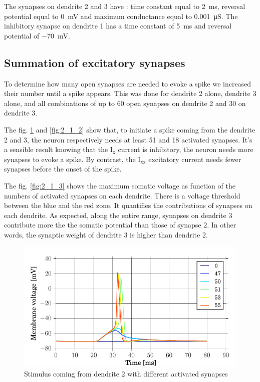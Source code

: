 \documentclass[a4paper, 10pt, conference]{ieeeconf}      %
\begin{document}
The synapses on dendrite 2 and 3 have : time constant equal to \SI{2}{\milli\second}, reversal potential equal to \SI{0}{\milli\volt} and maximum conductance equal to \SI{0.001}{\micro\siemens}. The inhibitory synapse on dendrite 1 has a time constant of \SI{5}{\milli\second} and reversal potential of \SI{-70}{\milli\volt}. 


\subsection{Summation of excitatory synapses}

To determine how many open synapses are needed to evoke a spike we increased their number until a spike appears. This was done for dendrite 2 alone, dendrite 3 alone, and all combinations of up to 60 open synapses on dendrite 2 and 30 on dendrite 3. 

The fig. \ref{fig:2_1_1} and \ref{fig:2_1_2} show that, to initiate a spike coming from the dendrite 2 and 3, the neuron respectively needs at least 51 and 18 activated synapses. It’s a sensible result knowing that the I$_\text{x}$ current is inhibitory, the neuron needs more synapses to evoke a spike. By contrast, the I$_\text{xx}$ excitatory current needs fewer synapses before the onset of the spike. 

The fig. \ref{fig:2_1_3} shows the maximum somatic voltage as function of the numbers of activated synapses on each dendrite. There is a voltage threshold between the blue and the red zone. It quantifies the contributions of synapses on each dendrite. As expected, along the entire range, synapses on dendrite 3 contribute more the the somatic potential than those of synapse 2. In other words, the synaptic weight of dendrite 3 is higher than dendrite 2. 

\begin{figure}
\begin{center}
\includegraphics[width=\columnwidth]{../figures/2_1-dend2_synapse_number.pdf}
\end{center}

\caption{Stimulus coming from dendrite 2 with different activated synapses}
\label{fig:2_1_1}
\end{figure}
\end{document}
